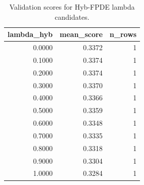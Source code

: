 \begin{table}[t]
\caption{Validation scores for Hyb-FPDE lambda candidates.}
\label{tab:lambda_distribution_computed}
\centering
\begin{tabular}{rrr}
\toprule
lambda\_hyb & mean\_score & n\_rows \\
\midrule
0.0000 & 0.3372 & 1 \\
0.1000 & 0.3374 & 1 \\
0.2000 & 0.3374 & 1 \\
0.3000 & 0.3370 & 1 \\
0.4000 & 0.3366 & 1 \\
0.5000 & 0.3359 & 1 \\
0.6000 & 0.3348 & 1 \\
0.7000 & 0.3335 & 1 \\
0.8000 & 0.3318 & 1 \\
0.9000 & 0.3304 & 1 \\
1.0000 & 0.3284 & 1 \\
\bottomrule
\end{tabular}

\end{table}

